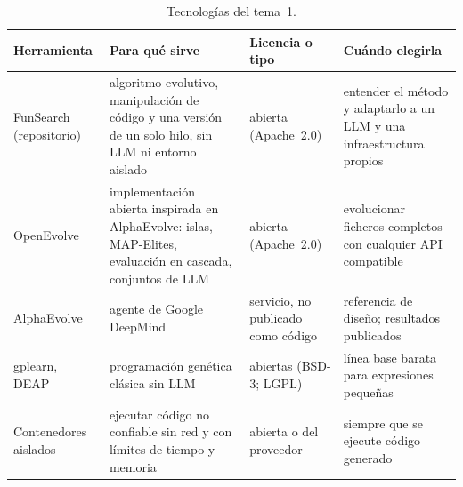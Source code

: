 \begin{table}[h]
\centering\small
\caption{Tecnologías del tema~1.}\label{tab:tec1}
\begin{tabularx}{\textwidth}{@{}>{\raggedright\arraybackslash}p{2.5cm}>{\raggedright\arraybackslash}X>{\raggedright\arraybackslash}p{2.1cm}>{\raggedright\arraybackslash}X@{}}
\toprule
Herramienta & Para qué sirve & Licencia o tipo & Cuándo elegirla \\
\midrule
FunSearch (repositorio)~\cite{funsearch-code} & algoritmo evolutivo, manipulación de código y una versión de un solo hilo, sin LLM ni entorno aislado & abierta (Apache~2.0) & entender el método y adaptarlo a un LLM y una infraestructura propios \\
OpenEvolve~\cite{openevolve} & implementación abierta inspirada en AlphaEvolve: islas, MAP-Elites, evaluación en cascada, conjuntos de LLM & abierta (Apache~2.0) & evolucionar ficheros completos con cualquier API compatible \\
AlphaEvolve~\cite{alphaevolve} & agente de Google DeepMind & servicio, no publicado como código & referencia de diseño; resultados publicados \\
gplearn, DEAP & programación genética clásica sin LLM & abiertas (BSD-3; LGPL) & línea base barata para expresiones pequeñas \\
Contenedores aislados & ejecutar código no confiable sin red y con límites de tiempo y memoria & abierta o del proveedor & siempre que se ejecute código generado \\
\bottomrule
\end{tabularx}
\end{table}

\addtocounter{definicion}{1}%

